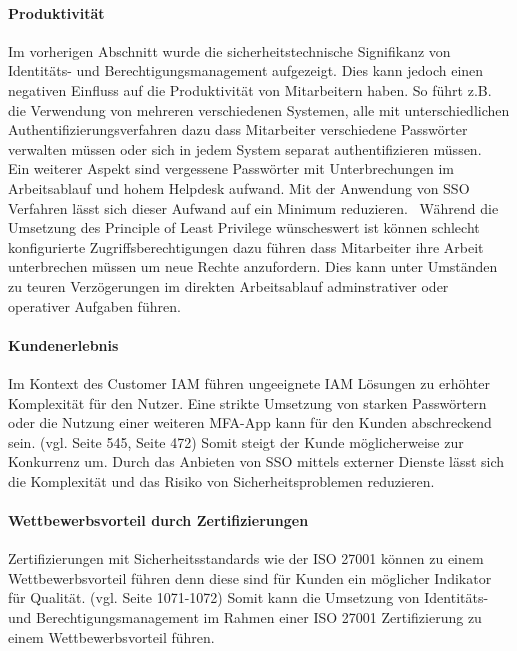 \documentclass[11pt]{article}
\begin{document}
\paragraph{Produktivität}
Im vorherigen Abschnitt wurde die sicherheitstechnische Signifikanz von Identitäts- und Berechtigungsmanagement aufgezeigt. Dies kann jedoch einen negativen Einfluss auf die Produktivität von Mitarbeitern haben. So führt z.B. die Verwendung von mehreren verschiedenen Systemen, alle mit unterschiedlichen Authentifizierungsverfahren dazu dass Mitarbeiter verschiedene Passwörter verwalten müssen oder sich in jedem System separat authentifizieren müssen.~\cite{radha2012survey}\cite{haag2012selecting} Ein weiterer Aspekt sind vergessene Passwörter mit Unterbrechungen im Arbeitsablauf und hohem Helpdesk aufwand. Mit der Anwendung von SSO Verfahren lässt sich dieser Aufwand auf ein Minimum reduzieren.~\cite{thakur2015user} Während die Umsetzung des Principle of Least Privilege wünscheswert ist können schlecht konfigurierte Zugriffsberechtigungen dazu führen dass Mitarbeiter ihre Arbeit unterbrechen müssen um neue Rechte anzufordern. Dies kann unter Umständen zu teuren Verzögerungen im direkten Arbeitsablauf adminstrativer oder operativer Aufgaben führen.~\cite{weishaupl2015towards}
\paragraph{Kundenerlebnis}
Im Kontext des Customer IAM führen ungeeignete IAM Lösungen zu erhöhter Komplexität für den Nutzer. Eine strikte Umsetzung von starken Passwörtern oder die Nutzung einer weiteren MFA-App kann für den Kunden abschreckend sein. (vgl. \cite{azhar2014economics} Seite 545, \cite{liveretos2022customer} Seite 472) Somit steigt der Kunde möglicherweise zur Konkurrenz um. Durch das Anbieten von SSO mittels externer Dienste lässt sich die Komplexität und das Risiko von Sicherheitsproblemen reduzieren.
\paragraph{Wettbewerbsvorteil durch Zertifizierungen}
Zertifizierungen mit Sicherheitsstandards wie der ISO 27001 können zu einem Wettbewerbsvorteil führen denn diese sind für Kunden ein möglicher Indikator für Qualität. (vgl. \cite{dobrin2015quality} Seite 1071-1072) Somit kann die Umsetzung von Identitäts- und Berechtigungsmanagement im Rahmen einer ISO 27001 Zertifizierung zu einem Wettbewerbsvorteil führen.
\end{document}
